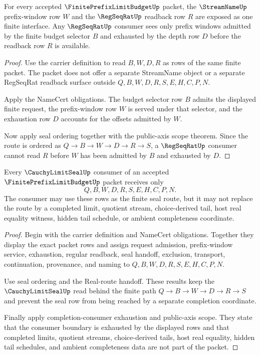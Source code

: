 \begin{theorem}
\label{thm:finite-prefix-limit-budget-regseq-streamname-interface}
For every accepted $\FinitePrefixLimitBudgetUp$ packet, the $\StreamNameUp$ prefix-window row $W$ and the $\RegSeqRatUp$ readback row $R$ are exposed as one finite interface. Any $\RegSeqRatUp$ consumer sees only prefix windows admitted by the finite budget selector $B$ and exhausted by the depth row $D$ before the readback row $R$ is available.
\end{theorem}
\begin{proof}
Use the carrier definition to read $B,W,D,R$ as rows of the same finite packet. The packet does not offer a separate StreamName object or a separate RegSeqRat readback surface outside $Q,B,W,D,R,S,E,H,C,P,N$.

Apply the NameCert obligations. The budget selector row $B$ admits the displayed finite request, the prefix-window row $W$ is served under that selector, and the exhaustion row $D$ accounts for the offsets admitted by $W$.

Now apply seal ordering together with the public-axis scope theorem. Since the route is ordered as $Q \to B \to W \to D \to R \to S$, a $\RegSeqRatUp$ consumer cannot read $R$ before $W$ has been admitted by $B$ and exhausted by $D$.
\end{proof}

\begin{theorem}
\label{thm:finite-prefix-limit-budget-cauchy-limit-seal-consumer-scope}
Every $\CauchyLimitSealUp$ consumer of an accepted $\FinitePrefixLimitBudgetUp$ packet receives only
$$
Q,B,W,D,R,S,E,H,C,P,N.
$$
The consumer may use these rows as the finite seal route, but it may not replace the route by a completed limit, quotient stream, choice-derived tail, host real equality witness, hidden tail schedule, or ambient completeness coordinate.
\end{theorem}
\begin{proof}
Begin with the carrier definition and NameCert obligations. Together they display the exact packet rows and assign request admission, prefix-window service, exhaustion, regular readback, seal handoff, exclusion, transport, continuation, provenance, and naming to $Q,B,W,D,R,S,E,H,C,P,N$.

Use seal ordering and the Real-route handoff. These results keep the $\CauchyLimitSealUp$ read behind the finite path $Q \to B \to W \to D \to R \to S$ and prevent the seal row from being reached by a separate completion coordinate.

Finally apply completion-consumer exhaustion and public-axis scope. They state that the consumer boundary is exhausted by the displayed rows and that completed limits, quotient streams, choice-derived tails, host real equality, hidden tail schedules, and ambient completeness data are not part of the packet.
\end{proof}

